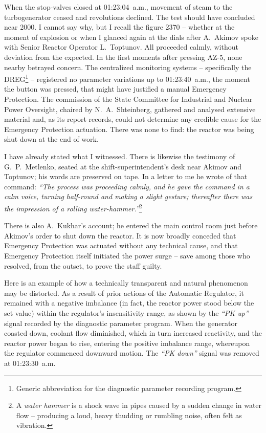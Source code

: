 \documentclass[openright]{bookest}
\begin{document}
When the stop-valves closed at 01:23:04~a.m., movement of steam to the turbogenerator ceased and revolutions declined. The test should have concluded near \qty{2000}{\rpm}. I cannot say why, but I recall the figure \qty{2370}{\rpm} -- whether at the moment of explosion or when I glanced again at the dials after A.~Akimov spoke with Senior Reactor Operator L.~Toptunov. All proceeded calmly, without deviation from the expected. In the first moments after pressing AZ-5, none nearby betrayed concern. The centralized monitoring systems -- specifically the DREG\footnote{Generic abbreviation for the diagnostic parameter recording program.} -- registered no parameter variations up to 01:23:40~a.m., the moment the button was pressed, that might have justified a manual Emergency Protection. The commission of the State Committee for Industrial and Nuclear Power Oversight, chaired by N.~A.~Shteinberg, gathered and analysed extensive material and, as its report records, could not determine any credible cause for the Emergency Protection actuation. There was none to find: the reactor was being shut down at the end of work.

I have already stated what I witnessed. There is likewise the testimony of G.~P.~Metlenko, seated at the shift-superintendent's desk near Akimov and Toptunov; his words are preserved on tape. In a letter to me he wrote of that command: \textit{``The process was proceeding calmly, and he gave the command in a calm voice, turning half-round and making a slight gesture; thereafter there was the impression of a rolling water-hammer.''}\footnote{A \textit{water hammer} is a shock wave in pipes caused by a sudden change in water flow -- producing a loud, heavy thudding or rumbling noise, often felt as vibration.}

There is also A.~Kukhar's account; he entered the main control room just before Akimov's order to shut down the reactor. It is now broadly conceded that Emergency Protection was actuated without any technical cause, and that Emergency Protection itself initiated the power surge -- save among those who resolved, from the outset, to prove the staff guilty.

Here is an example of how a technically transparent and natural phenomenon may be distorted. As a result of prior actions of the Automatic Regulator, it remained with a negative imbalance (in fact, the reactor power stood below the set value) within the regulator's insensitivity range, as shown by the \textit{``PK up''} signal recorded by the diagnostic parameter program. When the generator coasted down, coolant flow diminished, which in turn increased reactivity, and the reactor power began to rise, entering the positive imbalance range, whereupon the regulator commenced downward motion. The \textit{``PK down''} signal was removed at 01:23:30~a.m.
\end{document}
